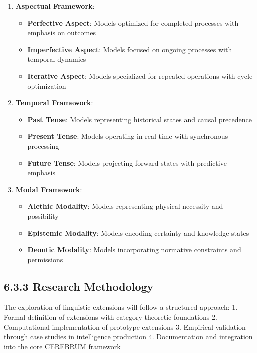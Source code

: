 \documentclass[
  11pt,
  letterpaper,
]{article}
\providecommand{\tightlist}{%
  \setlength{\itemsep}{0pt}\setlength{\parskip}{0pt}}
\begin{document}
\begin{enumerate}
\def\labelenumi{\arabic{enumi}.}
\tightlist
\item
  \textbf{Aspectual Framework}:

  \begin{itemize}
  \tightlist
  \item
    \textbf{Perfective Aspect}: Models optimized for completed processes
    with emphasis on outcomes
  \item
    \textbf{Imperfective Aspect}: Models focused on ongoing processes
    with temporal dynamics
  \item
    \textbf{Iterative Aspect}: Models specialized for repeated
    operations with cycle optimization
  \end{itemize}
\item
  \textbf{Temporal Framework}:

  \begin{itemize}
  \tightlist
  \item
    \textbf{Past Tense}: Models representing historical states and
    causal precedence
  \item
    \textbf{Present Tense}: Models operating in real-time with
    synchronous processing
  \item
    \textbf{Future Tense}: Models projecting forward states with
    predictive emphasis
  \end{itemize}
\item
  \textbf{Modal Framework}:

  \begin{itemize}
  \tightlist
  \item
    \textbf{Alethic Modality}: Models representing physical necessity
    and possibility
  \item
    \textbf{Epistemic Modality}: Models encoding certainty and knowledge
    states
  \item
    \textbf{Deontic Modality}: Models incorporating normative
    constraints and permissions
  \end{itemize}
\end{enumerate}

\hypertarget{research-methodology}{%
\subsection{6.3.3 Research Methodology}\label{research-methodology}}

The exploration of linguistic extensions will follow a structured
approach: 1. Formal definition of extensions with category-theoretic
foundations 2. Computational implementation of prototype extensions 3.
Empirical validation through case studies in intelligence production 4.
Documentation and integration into the core CEREBRUM framework
\end{document}
